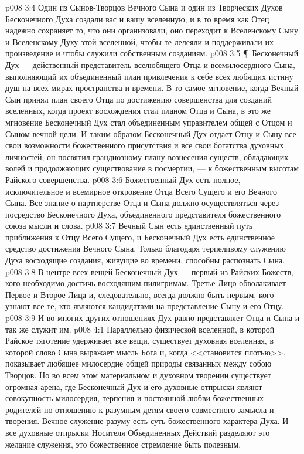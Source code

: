 \vs p008 3:4 Один из Сынов\hyp{}Творцов Вечного Сына и один из Творческих Духов Бесконечного Духа создали вас и вашу вселенную; и в то время как Отец надежно сохраняет то, что они организовали, оно переходит к Вселенскому Сыну и Вселенскому Духу этой вселенной, чтобы те лелеяли и поддерживали их произведение и чтобы служили собственным созданиям.
\vs p008 3:5 \P\ Бесконечный Дух --- действенный представитель вселюбящего Отца и всемилосердного Сына, выполняющий их объединенный план привлечения к себе всех любящих истину душ на всех мирах пространства и времени. В то самое мгновение, когда Вечный Сын принял план своего Отца по достижению совершенства для созданий вселенных, когда проект восхождения стал планом Отца и Сына, в это же мгновение Бесконечный Дух стал объединенным управителем общей с Отцом и Сыном вечной цели. И таким образом Бесконечный Дух отдает Отцу и Сыну все свои возможности божественного присутствия и все свои богатства духовных личностей; он посвятил  грандиозному плану вознесения существ, обладающих волей и продолжающих существование в посмертии, --- к божественным высотам Райского совершенства.
\vs p008 3:6 Божественный Дух есть полное, исключительное и всемирное откровение Отца Всего Сущего и его Вечного Сына. Все знание о партнерстве Отца и Сына должно осуществляться через посредство Бесконечного Духа, объединенного представителя божественного союза мысли и слова.
\vs p008 3:7 Вечный Сын есть единственный путь приближения к Отцу Всего Сущего, и Бесконечный Дух есть единственное средство достижения Вечного Сына. Только благодаря терпеливому служению Духа восходящие создания, живущие во времени, способны распознать Сына.
\vs p008 3:8 В центре всех вещей Бесконечный Дух --- первый из Райских Божеств, кого необходимо достичь восходящим пилигримам. Третье Лицо обволакивает Первое и Второе Лица и, следовательно, всегда должно быть первым, кого узнают все те, кто являются кандидатами на представление Сыну и его Отцу.
\vs p008 3:9 И во многих других отношениях Дух равно представляет Отца и Сына и так же служит им.
\vs p008 4:1 Параллельно физической вселенной, в которой Райское тяготение удерживает все вещи, существует духовная вселенная, в которой слово Сына выражает мысль Бога и, когда <<становится плотью>>, показывает любящее милосердие общей природы связанных между собою Творцов. Но во всем этом материальном и духовном творении существует огромная арена, где Бесконечный Дух и его духовные отпрыски являют совокупность милосердия, терпения и постоянной любви божественных родителей по отношению к разумным детям своего совместного замысла и творения. Вечное служение разуму есть суть божественного характера Духа. И все духовные отпрыски Носителя Объединенных Действий разделяют это желание служения, это божественное стремление быть полезным.
